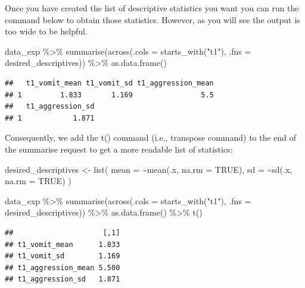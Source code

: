 \documentclass[
]{krantz}
\makeatletter
\newenvironment{Shaded}{\begin{snugshade}}{\end{snugshade}}
\newcommand{\AttributeTok}[1]{\textcolor[rgb]{0.61,0.61,0.61}{#1}}
\newcommand{\ConstantTok}[1]{\textcolor[rgb]{0,0,0}{#1}}
\newcommand{\FunctionTok}[1]{\textcolor[rgb]{0,0,0}{#1}}
\newcommand{\NormalTok}[1]{#1}
\newcommand{\OtherTok}[1]{\textcolor[rgb]{0.37,0.37,0.37}{#1}}
\newcommand{\SpecialCharTok}[1]{\textcolor[rgb]{0,0,0}{#1}}
\newcommand{\StringTok}[1]{\textcolor[rgb]{0.5,0.5,0.5}{#1}}
\newenvironment{kframe}{%
\medskip{}
\setlength{\fboxsep}{.8em}
 \def\at@end@of@kframe{}%
 \ifinner\ifhmode%
  \def\at@end@of@kframe{\end{minipage}}%
  \begin{minipage}{\columnwidth}%
 \fi\fi%
 \def\FrameCommand##1{\hskip\@totalleftmargin \hskip-\fboxsep
 \colorbox{shadecolor}{##1}\hskip-\fboxsep
     \hskip-\linewidth \hskip-\@totalleftmargin \hskip\columnwidth}%
 \MakeFramed {\advance\hsize-\width
   \@totalleftmargin\z@ \linewidth\hsize
   \@setminipage}}%
 {\par\unskip\endMakeFramed%
 \at@end@of@kframe}
\renewenvironment{Shaded}{\begin{kframe}}{\end{kframe}}
\makeatother
\begin{document}
Once you have created the list of descriptive statistics you want you can run the command below to obtain those statistics. However, as you will see the output is too wide to be helpful.

\begin{Shaded}
\begin{Highlighting}[]
\NormalTok{data\_exp }\SpecialCharTok{\%\textgreater{}\%}
  \FunctionTok{summarise}\NormalTok{(}\FunctionTok{across}\NormalTok{(}\AttributeTok{.cols =} \FunctionTok{starts\_with}\NormalTok{(}\StringTok{"t1"}\NormalTok{), }
                   \AttributeTok{.fns =}\NormalTok{ desired\_descriptives)) }\SpecialCharTok{\%\textgreater{}\%}
  \FunctionTok{as.data.frame}\NormalTok{()}
\end{Highlighting}
\end{Shaded}

\begin{verbatim}
##   t1_vomit_mean t1_vomit_sd t1_aggression_mean
## 1         1.833       1.169                5.5
##   t1_aggression_sd
## 1            1.871
\end{verbatim}

Consequently, we add the t() command (i.e., transpose command) to the end of the summarise request to get a more readable list of statistics:

\begin{Shaded}
\begin{Highlighting}[]
\NormalTok{desired\_descriptives }\OtherTok{\textless{}{-}} \FunctionTok{list}\NormalTok{(}
  \AttributeTok{mean =} \SpecialCharTok{\textasciitilde{}}\FunctionTok{mean}\NormalTok{(.x, }\AttributeTok{na.rm =} \ConstantTok{TRUE}\NormalTok{),}
  \AttributeTok{sd =} \SpecialCharTok{\textasciitilde{}}\FunctionTok{sd}\NormalTok{(.x, }\AttributeTok{na.rm =} \ConstantTok{TRUE}\NormalTok{)}
\NormalTok{)}

\NormalTok{data\_exp }\SpecialCharTok{\%\textgreater{}\%}
  \FunctionTok{summarise}\NormalTok{(}\FunctionTok{across}\NormalTok{(}\AttributeTok{.cols =} \FunctionTok{starts\_with}\NormalTok{(}\StringTok{"t1"}\NormalTok{), }
                   \AttributeTok{.fns =}\NormalTok{ desired\_descriptives)) }\SpecialCharTok{\%\textgreater{}\%}
  \FunctionTok{as.data.frame}\NormalTok{() }\SpecialCharTok{\%\textgreater{}\%}
  \FunctionTok{t}\NormalTok{() }
\end{Highlighting}
\end{Shaded}

\begin{verbatim}
##                     [,1]
## t1_vomit_mean      1.833
## t1_vomit_sd        1.169
## t1_aggression_mean 5.500
## t1_aggression_sd   1.871
\end{verbatim}
\end{document}
